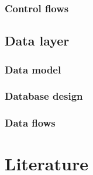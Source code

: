 \documentclass[signature]{deltares_report}
\begin{document}
\subsection{Control flows}
\label{subsec:controlFlows}

\section{Data layer}
\label{sec:dataLayer}

\subsection{Data model}
\label{subsec:dataModel}

\subsection{Database design}
\label{subsec:databaseDesign}

\subsection{Data flows}
\label{subsec:dataFlows}


\chapter{Literature}  \label{chapterLiterature}



\pagestyle{empty}
\mbox{}

\end{document}
